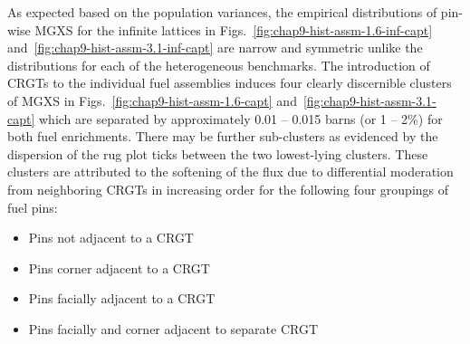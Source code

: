As expected based on the population variances, the empirical distributions of pin-wise \ac{MGXS} for the infinite lattices in Figs.~\ref{fig:chap9-hist-assm-1.6-inf-capt} and~\ref{fig:chap9-hist-assm-3.1-inf-capt} are narrow and symmetric unlike the distributions for each of the heterogeneous benchmarks. The introduction of \acp{CRGT} to the individual fuel assemblies induces four clearly discernible clusters of \ac{MGXS} in Figs.~\ref{fig:chap9-hist-assm-1.6-capt} and~\ref{fig:chap9-hist-assm-3.1-capt} which are separated by approximately 0.01 -- 0.015 barns (or 1 -- 2\%) for both fuel enrichments. There may be further sub-clusters as evidenced by the dispersion of the rug plot ticks between the two lowest-lying clusters. These clusters are attributed to the softening of the flux due to differential moderation from neighboring \acp{CRGT} in increasing order for the following four groupings of fuel pins:

\begin{itemize}[noitemsep, itemsep=-0.75em]
  \item Pins not adjacent to a \ac{CRGT}
  \item Pins corner adjacent to a \ac{CRGT}
  \item Pins facially adjacent to a \ac{CRGT}
  \item Pins facially and corner adjacent to separate \ac{CRGT}
\end{itemize}

